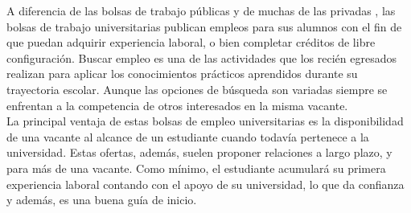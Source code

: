 A diferencia de las bolsas de trabajo públicas y de muchas de las privadas , las bolsas de trabajo universitarias publican empleos para sus alumnos con el fin de que puedan adquirir experiencia laboral, o bien completar créditos de libre configuración. Buscar empleo es una de las actividades que los recién egresados realizan para aplicar los conocimientos prácticos aprendidos durante su trayectoria escolar. Aunque las opciones de búsqueda son variadas siempre se enfrentan a la competencia de otros 
interesados en la misma vacante. \cite{UniJob}\\

La principal ventaja de estas bolsas de empleo universitarias es la disponibilidad de una vacante al alcance de un estudiante cuando todavía 
pertenece a la universidad. Estas ofertas, además, suelen proponer relaciones a largo plazo, y para más de una vacante. 
Como mínimo, el estudiante acumulará su primera experiencia laboral contando con el apoyo de su universidad, lo que da confianza y además, es una buena guía de inicio.
\clearpage
